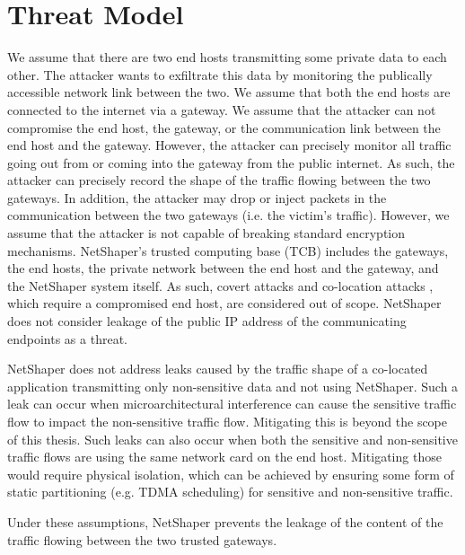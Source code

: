 \section{Threat Model}
\label{sec:netshaper-threat-model}

We assume that there are two end hosts transmitting some private data to each other.
The attacker wants to exfiltrate this data by monitoring the publically accessible network link between the two.
We assume that both the end hosts are connected to the internet via a gateway.
We assume that the attacker can not compromise the end host, the gateway, or the communication link between the end host and the gateway.
However, the attacker can precisely monitor all traffic going out from or coming into the gateway from the public internet. 
As such, the attacker can precisely record the shape of the traffic flowing between the two gateways.
In addition, the attacker may drop or inject packets in the communication between the two gateways (i.e. the victim's traffic).
However, we assume that the attacker is not capable of breaking standard encryption mechanisms.
NetShaper's trusted computing base (TCB) includes the gateways, the end hosts, the private network between the end host and the gateway, and the NetShaper system itself.
As such, covert attacks \cite{zhang2011predinteractive} and co-location attacks \cite{schuster2017beautyburst,mehta2022pacer}, which require a compromised end host, are considered out of scope.
NetShaper does not consider leakage of the public IP address of the communicating endpoints as a threat.

NetShaper does not address leaks caused by the traffic shape of a co-located application transmitting only non-sensitive data and not using NetShaper.
Such a leak can occur when microarchitectural interference can cause the sensitive traffic flow to impact the non-sensitive traffic flow. 
Mitigating this is beyond the scope of this thesis.
Such leaks can also occur when both the sensitive and non-sensitive traffic flows are using the same network card on the end host.
Mitigating those would require physical isolation, which can be achieved by ensuring some form of static partitioning (e.g. TDMA scheduling) for sensitive and non-sensitive traffic.

Under these assumptions, NetShaper prevents the leakage of the content of the traffic flowing between the two trusted gateways.